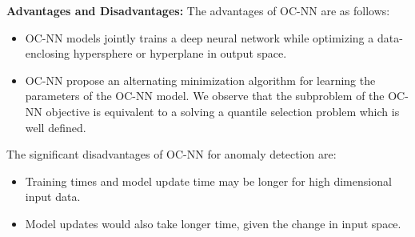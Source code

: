 \textbf{Advantages and Disadvantages:}
The advantages of OC-NN  are as follows:
\begin{itemize}
\item  OC-NN  models jointly trains a deep neural network while optimizing a data-enclosing hypersphere or hyperplane in output space.
\item OC-NN propose an alternating minimization algorithm for learning
the parameters of the OC-NN model. We observe that the subproblem of the OC-NN objective is equivalent to a solving a quantile selection problem which is well defined.
\end{itemize}
The significant disadvantages of OC-NN for anomaly detection are:
\begin{itemize}
\item Training times  and model update time may be longer for high dimensional input data.
\item Model updates would also take longer time, given the change in input space.
\end{itemize}


